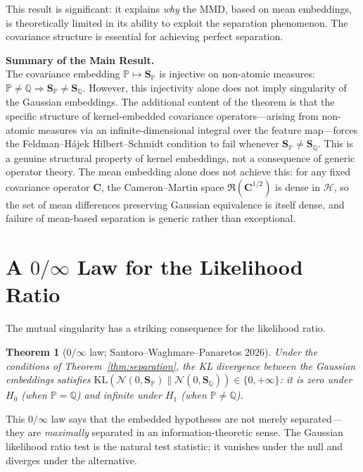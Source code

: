 \documentclass[12pt, oneside]{book}
\theoremstyle{plain}
\newtheorem{theorem}{Theorem}[chapter]
\theoremstyle{definition}
\newcommand{\calH}{\mathcal{H}}
\newcommand{\calN}{\mathcal{N}}
\newcommand{\PP}{\mathbb{P}}
\newcommand{\QQ}{\mathbb{Q}}
\newcommand{\ran}{\mathfrak{R}}
\newcommand{\SP}{\mathbf{S}_{\PP}}
\newcommand{\SQ}{\mathbf{S}_{\QQ}}
\newcommand{\KL}{\mathrm{KL}}
\begin{document}
This result is significant: it explains \emph{why} the MMD, based on mean embeddings, is theoretically limited in its ability to exploit the separation phenomenon. The covariance structure is essential for achieving perfect separation.

\begin{highlightbox}
\textbf{Summary of the Main Result.}\\[4pt]
The covariance embedding $\PP \mapsto \SP$ is injective on non-atomic measures: $\PP \neq \QQ \Rightarrow \SP \neq \SQ$.
However, this injectivity alone does not imply singularity of the Gaussian embeddings. The additional content of the theorem is that the specific structure of kernel-embedded covariance operators---arising from non-atomic measures via an infinite-dimensional integral over the feature map---forces the Feldman--H\'ajek Hilbert--Schmidt condition to fail whenever $\SP \neq \SQ$.
This is a genuine structural property of kernel embeddings, not a consequence of generic operator theory.
The mean embedding alone does not achieve this: for any fixed covariance operator $\mathbf{C}$, the Cameron--Martin space $\ran(\mathbf{C}^{1/2})$ is dense in $\calH$, so the set of mean differences preserving Gaussian equivalence is itself dense, and failure of mean-based separation is generic rather than exceptional.
\end{highlightbox}

\section{A $0/\infty$ Law for the Likelihood Ratio}

The mutual singularity has a striking consequence for the likelihood ratio.

\begin{theorem}[$0/\infty$ law; Santoro--Waghmare--Panaretos 2026]
\label{thm:zero_infty}
Under the conditions of Theorem~\ref{thm:separation}, the KL divergence between the Gaussian embeddings satisfies $\KL\!\left(\calN(0, \SP) \| \calN(0, \SQ)\right) \in \{0, +\infty\}$: it is zero under $H_0$ (when $\PP = \QQ$) and infinite under $H_1$ (when $\PP \neq \QQ$).
\end{theorem}

This $0/\infty$ law says that the embedded hypotheses are not merely separated---they are \emph{maximally} separated in an information-theoretic sense. The Gaussian likelihood ratio test is the natural test statistic; it vanishes under the null and diverges under the alternative.
\end{document}
